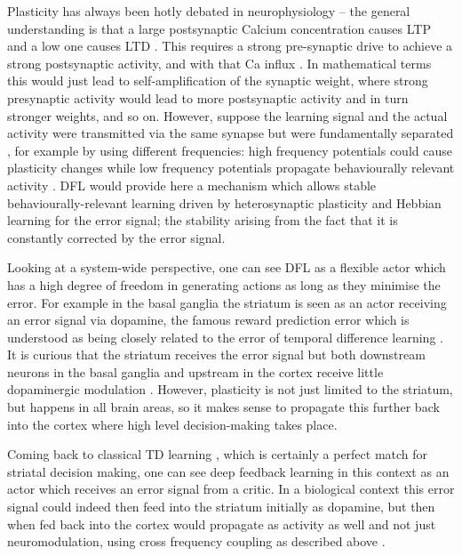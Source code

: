 \documentclass{aamas2018}
\begin{document}
Plasticity has always been hotly debated in neurophysiology -- the
general understanding is that a large postsynaptic Calcium
concentration causes LTP \cite{Malenka99,Bennett2000} and a low one
causes LTD \cite{Mulkey1992}. This requires a strong pre-synaptic
drive to achieve a strong postsynaptic activity, and with that Ca
influx \cite{Meunier2017}. In mathematical terms this would just lead
to self-amplification of the synaptic weight, where strong presynaptic
activity would lead to more postsynaptic activity and in turn stronger
weights, and so on. However, suppose the learning signal and the
actual activity were transmitted via the same synapse but were
fundamentally separated \cite{Lindsay2017}, for example by using
different frequencies: high frequency potentials could cause
plasticity changes while low frequency potentials propagate
behaviourally relevant activity \cite{Canolty2010}. DFL would provide
here a mechanism which allows stable behaviourally-relevant learning
driven by heterosynaptic plasticity and Hebbian learning for the error
signal; the stability arising from the fact that it is constantly
corrected by the error signal.

Looking at a system-wide perspective, one can see DFL as a flexible
actor which has a high degree of freedom in generating actions as long as they
minimise the error. For example in the basal ganglia the striatum is
seen as an actor receiving an error signal via dopamine, the famous
reward prediction error \cite{Schultz97} which is understood as being
closely related to the error of temporal difference learning
\cite{gurney98:_basal_gangl_action_selec_devic}. It is curious that
the striatum receives the error signal but both downstream neurons in
the basal ganglia and upstream in the cortex receive little
dopaminergic modulation \cite{Beckstead1979}. However, plasticity is
not just limited to the striatum, but happens in all brain areas, so
it makes sense to propagate this further back into the cortex
\cite{Groenewegen1993} where high level decision-making takes place.

Coming back to classical TD learning \cite{Sutton87}, which is
certainly a perfect match for striatal decision making, one can see
deep feedback learning in this context as an actor which receives an
error signal from a critic. In a biological context this error signal
could indeed then feed into the striatum initially as dopamine, but
then when fed back into the cortex would propagate as activity
as well and not just neuromodulation, using cross frequency coupling
as described above \cite{Lipski2017}.
\end{document}
